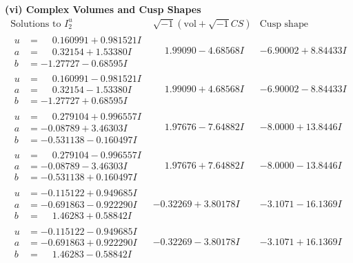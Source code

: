 \documentclass[1p]{elsarticle_modified}
\theoremstyle{definition}
\newcommand{\I}{\sqrt{-1}}
\begin{document}
\newpage\flushleft \textbf{(vi) Complex Volumes and Cusp Shapes}
$$\begin{array}{c|c|c}  
\text{Solutions to }I^u_{2}& \I (\text{vol} + \sqrt{-1}CS) & \text{Cusp shape}\\
 \hline 
\begin{aligned}
u &= \phantom{-}0.160991 + 0.981521 I \\
a &= \phantom{-}0.32154 + 1.53380 I \\
b &= -1.27727 - 0.68595 I\end{aligned}
 & \phantom{-}1.99090 - 4.68568 I & -6.90002 + 8.84433 I \\ \hline\begin{aligned}
u &= \phantom{-}0.160991 - 0.981521 I \\
a &= \phantom{-}0.32154 - 1.53380 I \\
b &= -1.27727 + 0.68595 I\end{aligned}
 & \phantom{-}1.99090 + 4.68568 I & -6.90002 - 8.84433 I \\ \hline\begin{aligned}
u &= \phantom{-}0.279104 + 0.996557 I \\
a &= -0.08789 + 3.46303 I \\
b &= -0.531138 - 0.160497 I\end{aligned}
 & \phantom{-}1.97676 - 7.64882 I & -8.0000 + 13.8446 I \\ \hline\begin{aligned}
u &= \phantom{-}0.279104 - 0.996557 I \\
a &= -0.08789 - 3.46303 I \\
b &= -0.531138 + 0.160497 I\end{aligned}
 & \phantom{-}1.97676 + 7.64882 I & -8.0000 - 13.8446 I \\ \hline\begin{aligned}
u &= -0.115122 + 0.949685 I \\
a &= -0.691863 - 0.922290 I \\
b &= \phantom{-}1.46283 + 0.58842 I\end{aligned}
 & -0.32269 + 3.80178 I & -3.1071 - 16.1369 I \\ \hline\begin{aligned}
u &= -0.115122 - 0.949685 I \\
a &= -0.691863 + 0.922290 I \\
b &= \phantom{-}1.46283 - 0.58842 I\end{aligned}
 & -0.32269 - 3.80178 I & -3.1071 + 16.1369 I \\ \hline\begin{aligned}

\end{aligned}
\end{array}$$
\end{document}
